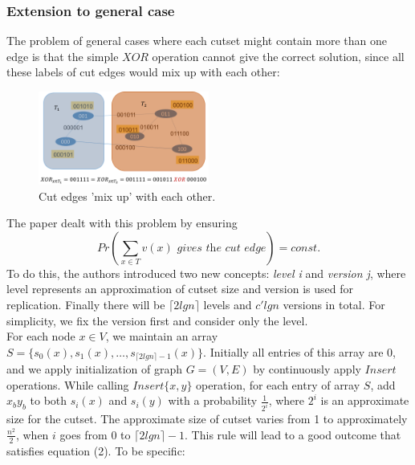 \documentclass[conference,compsoc]{IEEEtran}
\begin{document}
\subsubsection*{Extension to general case} 
The problem of general cases where each cutset might contain more than one edge is that the simple $XOR$ operation cannot give the correct solution, since all these labels of cut edges would mix up with each other:
\begin{figure}[H]
	\centering
	\includegraphics[width=0.5\textwidth]{Pic/6.png}
	\caption{Cut edges 'mix up' with each other.}
	\label{fig:6}
\end{figure}
The paper dealt with this problem by ensuring 
\begin{equation}
Pr(\sum_{x\in T} v(x)\textit{ gives the cut edge})=const.
\end{equation} 
To do this, the authors introduced two new concepts: \textit{level i} and \textit{version j}, where level represents an approximation of cutset size and version is used for replication. Finally there will be $\lceil 2lgn \rceil$ levels and $c'lgn$ versions in total. For simplicity, we fix the version first and consider only the level.\\
For each node $x\in V$, we maintain an array $S=\{s_0(x),s_1(x),\dots,s_{\lceil 2lgn \rceil-1}(x)\}$. Initially all entries of this array are 0, and we apply initialization of graph $G=(V,E)$ by continuously apply $Insert$ operations. While calling $Insert\{x,y\}$ operation, for each entry of array $S$, add $x_by_b$ to both $s_i(x)$ and $s_i(y)$ with a probability $\frac{1}{2^i}$, where $2^i$ is an approximate size for the cutset. The approximate size of cutset varies from 1 to approximately $\frac{n^2}{2}$, when $i$ goes from $0$ to $\lceil 2lgn \rceil-1$. This rule will lead to a good outcome that satisfies equation (2). To be specific:
\end{document}
